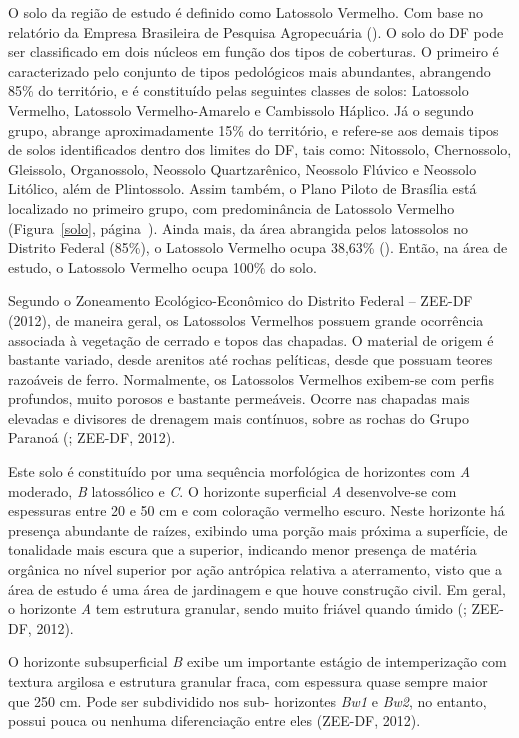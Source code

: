 \documentclass[a4paper, 12 pt]{article} %
\begin{document}
O solo da região de estudo é definido como Latossolo Vermelho. Com base no relatório da Empresa Brasileira de Pesquisa Agropecuária (\citealp{freitas1978levantamento}). O solo do DF pode ser classificado em dois núcleos em função dos tipos de coberturas. O primeiro é caracterizado pelo conjunto de tipos pedológicos mais abundantes, abrangendo 85\% do território, e é constituído pelas seguintes classes de solos: Latossolo Vermelho, Latossolo Vermelho-Amarelo e Cambissolo Háplico. Já o segundo grupo, abrange aproximadamente 15\% do território, e refere-se aos demais tipos de solos identificados dentro dos limites do DF, tais como: Nitossolo, Chernossolo, Gleissolo, Organossolo, Neossolo Quartzarênico, Neossolo Flúvico e Neossolo Litólico, além de Plintossolo. Assim também, o Plano Piloto de Brasília está localizado no primeiro grupo, com predominância de Latossolo Vermelho (Figura~\ref{solo}, página~\pageref{solo}). Ainda mais, da área abrangida pelos latossolos no Distrito Federal (85\%), o Latossolo Vermelho
ocupa 38,63\% (\citealp{martins2000petrografia}). Então, na área de estudo, o Latossolo Vermelho ocupa 100\% do solo.

Segundo o Zoneamento Ecológico-Econômico do Distrito Federal – ZEE-DF (2012), de maneira geral, os Latossolos Vermelhos possuem grande ocorrência associada à vegetação
de cerrado e topos das chapadas. O material de origem é bastante variado, desde arenitos até rochas pelíticas, desde que possuam teores razoáveis de ferro. Normalmente, os Latossolos Vermelhos exibem-se com perfis profundos, muito porosos e bastante permeáveis. Ocorre nas chapadas mais elevadas e divisores de drenagem mais contínuos, sobre as rochas do Grupo Paranoá (\citealp{martins2000petrografia}; ZEE-DF, 2012).

Este solo é constituído por uma sequência morfológica de horizontes com \textit{A} moderado, \textit{B} latossólico e \textit{C}. O horizonte superficial \textit{A} desenvolve-se com espessuras entre 20 e 50 cm e com coloração vermelho escuro. Neste horizonte há presença abundante de raízes, exibindo uma porção mais próxima a superfície, de tonalidade mais escura que a superior, indicando menor presença de matéria orgânica no nível superior por ação antrópica relativa a aterramento, visto que a área de estudo é uma área de jardinagem e que houve construção civil. Em geral, o horizonte \textit{A} tem estrutura granular, sendo muito friável quando úmido (\citealp{martins2000petrografia}; ZEE-DF, 2012).

O horizonte subsuperficial \textit{B} exibe um importante estágio de intemperização com textura argilosa e estrutura granular fraca, com espessura quase sempre maior que 250 cm.
Pode ser subdividido nos sub- horizontes \textit{Bw1} e \textit{Bw2}, no entanto, possui pouca ou nenhuma diferenciação entre eles (ZEE-DF, 2012).
\end{document}
